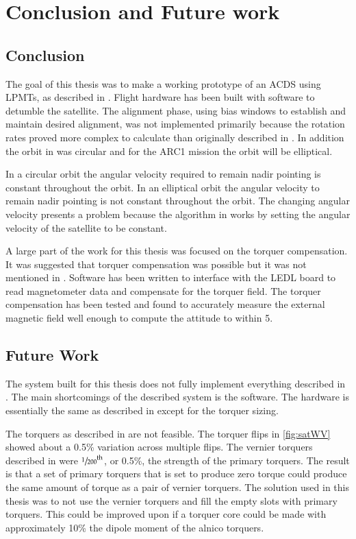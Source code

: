 
\chapter{Conclusion and Future work}

\section{Conclusion}

The goal of this thesis was to make a working prototype of an \ac{ACDS} using \acp{LPMT}, as described in \cite{Mentch11}. Flight hardware has been built with software to detumble the satellite. The alignment phase, using bias windows to establish and maintain desired alignment, was not implemented primarily because the rotation rates proved more complex to calculate than originally described in \cite{Mentch11}. In addition the orbit in \cite{Mentch11} was circular and for the \ac{ARC}1 mission the orbit will be elliptical.

In a circular orbit the angular velocity required to remain nadir pointing is constant throughout the orbit. In an elliptical orbit the angular velocity to remain nadir pointing is not constant throughout the orbit. The changing angular velocity presents a problem because the algorithm in \cite{Mentch11} works by setting the angular velocity of the satellite to be constant. 

A large part of the work for this thesis was focused on the torquer compensation. It was suggested that torquer compensation was possible but it was not mentioned in \cite{Mentch11}. Software has been written to interface with the \ac{LEDL} board to read magnetometer data and compensate for the torquer field. The torquer compensation has been tested and found to accurately measure the external magnetic field well enough to compute the attitude to within \textpm{}5\textdegree.

\section{Future Work}

The system built for this thesis does not fully implement everything described in \cite{Mentch11}. The main shortcomings of the described system is the software. The hardware is essentially the same as described in \cite{Mentch11} except for the torquer sizing.

The torquers as described in \cite{Mentch11} are not feasible. The torquer flips in \cref{fig:satWV} showed about a \textpm{}0.5\% variation across multiple flips. The vernier torquers described in \cite{Mentch11} were $\sfrac{1}{200}^{\mathrm{th}}$, or 0.5\%, the strength of the primary torquers. The result is that a set of primary torquers that is set to produce zero torque could produce the same amount of torque as a pair of vernier torquers. The solution used in this thesis was to not use the vernier torquers and fill the empty slots with primary torquers. This could be improved upon if a torquer core could be made with approximately 10\% the dipole moment of the alnico torquers. 


